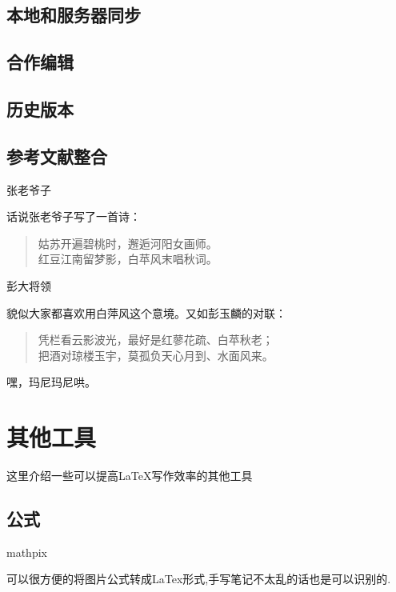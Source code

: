 \documentclass[]{ctexbook}
\begin{document}
\hypertarget{section-13}{%
\section{本地和服务器同步}\label{section-13}}

\hypertarget{section-14}{%
\section{合作编辑}\label{section-14}}

\hypertarget{section-15}{%
\section{历史版本}\label{section-15}}

\hypertarget{section-16}{%
\section{参考文献整合}\label{section-16}}

张老爷子

话说张老爷子写了一首诗：

\begin{quote}
姑苏开遍碧桃时，邂逅河阳女画师。\\
红豆江南留梦影，白苹风末唱秋词。
\end{quote}

彭大将领

貌似大家都喜欢用白萍风这个意境。又如彭玉麟的对联：

\begin{quote}
凭栏看云影波光，最好是红蓼花疏、白苹秋老；\\
把酒对琼楼玉宇，莫孤负天心月到、水面风来。
\end{quote}

嘿，玛尼玛尼哄。

\hypertarget{section-17}{%
\chapter{其他工具}\label{section-17}}

这里介绍一些可以提高LaTeX写作效率的其他工具

\hypertarget{section-18}{%
\section{公式}\label{section-18}}

mathpix

可以很方便的将图片公式转成LaTex形式,手写笔记不太乱的话也是可以识别的.
\end{document}

